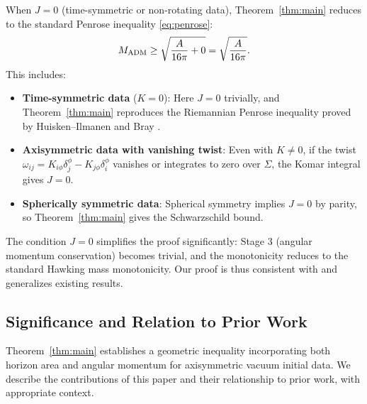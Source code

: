 \begin{remark}[Reduction to Standard Penrose Inequality When $J = 0$]\label{rem:J-zero}
When $J = 0$ (time-symmetric or non-rotating data), Theorem~\ref{thm:main} reduces to the standard Penrose inequality \eqref{eq:penrose}:
\[
M_{\mathrm{ADM}} \geq \sqrt{\frac{A}{16\pi} + 0} = \sqrt{\frac{A}{16\pi}}.
\]
This includes:
\begin{itemize}
    \item \textbf{Time-symmetric data} ($K = 0$): Here $J = 0$ trivially, and Theorem~\ref{thm:main} reproduces the Riemannian Penrose inequality proved by Huisken--Ilmanen \cite{huisken2001} and Bray \cite{bray2001}.
    \item \textbf{Axisymmetric data with vanishing twist}: Even with $K \neq 0$, if the twist $\omega_{ij} = K_{i\phi}\delta_j^\phi - K_{j\phi}\delta_i^\phi$ vanishes or integrates to zero over $\Sigma$, the Komar integral gives $J = 0$.
    \item \textbf{Spherically symmetric data}: Spherical symmetry implies $J = 0$ by parity, so Theorem~\ref{thm:main} gives the Schwarzschild bound.
\end{itemize}
The condition $J = 0$ simplifies the proof significantly: Stage 3 (angular momentum conservation) becomes trivial, and the monotonicity reduces to the standard Hawking mass monotonicity. Our proof is thus consistent with and generalizes existing results.
\end{remark}

\subsection{Significance and Relation to Prior Work}

Theorem~\ref{thm:main} establishes a geometric inequality incorporating both horizon area and angular momentum for axisymmetric vacuum initial data. We describe the contributions of this paper and their relationship to prior work, with appropriate context.

